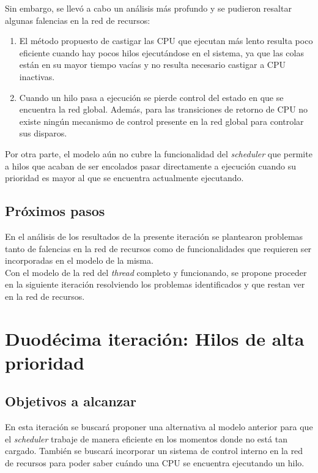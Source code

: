 \documentclass[a4paper]{book}
\begin{document}
Sin embargo, se llev\'o a cabo un an\'alisis m\'as profundo y se pudieron resaltar algunas falencias en la red de recursos:
\begin{enumerate}
\item El m\'etodo propuesto de castigar las CPU que ejecutan m\'as lento resulta poco eficiente cuando hay pocos hilos ejecut\'andose en el sistema, ya que las colas est\'an en su mayor tiempo vac\'ias y no resulta necesario castigar a CPU inactivas.
\item Cuando un hilo pasa a ejecuci\'on se pierde control del estado en que se encuentra la red global. Adem\'as, para las transiciones de retorno de CPU no existe ning\'un mecanismo de control presente en la red global para controlar sus disparos.
\end{enumerate}

Por otra parte, el modelo a\'un no cubre la funcionalidad del \emph{scheduler} que permite a hilos que acaban de ser encolados pasar directamente a ejecuci\'on cuando su prioridad es mayor al que se encuentra actualmente ejecutando.

\subsection{Pr\'oximos pasos}
En el an\'alisis de los resultados de la presente iteraci\'on se plantearon problemas tanto de falencias en la red de recursos como de funcionalidades que requieren ser incorporadas en el modelo de la misma.\\

Con el modelo de la red del \emph{thread} completo y funcionando, se propone proceder en la siguiente iteraci\'on resolviendo los problemas identificados y que restan ver en la red de recursos.


\newpage
\section{Duod\'ecima iteraci\'on: Hilos de alta prioridad}

\subsection{Objetivos a alcanzar}
En esta iteraci\'on se buscar\'a proponer una alternativa al modelo anterior para que el \emph{scheduler} trabaje de manera eficiente en los momentos donde no est\'a tan cargado. Tambi\'en se buscar\'a incorporar un sistema de control interno en la red de recursos para poder saber cu\'ando una CPU se encuentra ejecutando un hilo.\\
\end{document}
